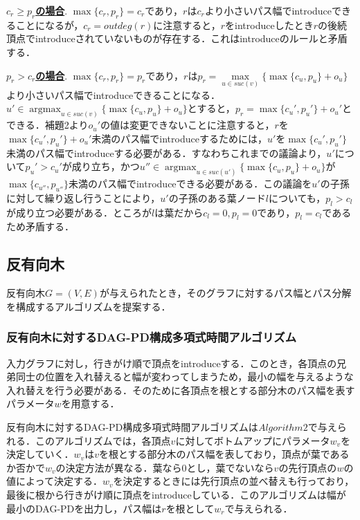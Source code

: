 \documentclass{kuisthesis}           %
\begin{document}
 \textbf{\underline{$c_r \geq p_r$の場合}}.
 $ \max\{c_r, p_r\}=c_r$であり，$r$は$c_r$より小さいパス幅でintroduceできることになるが，$c_r=outdeg(r)$に注意すると，$r$をintroduceしたとき$r$の後続頂点でintroduceされていないものが存在する．これはintroduceのルールと矛盾する．

 \textbf{\underline{$p_r > c_r$の場合}}.
 $ \max\{c_r, p_r\}=p_r$であり，$r$は$p_r= \underset{u \in suc(v)}{\max}\{ \max\{c_u, p_u\}+o_u\}$より小さいパス幅でintroduceできることになる．$u' \in\operatorname*{argmax}_{u \in suc(v)} \{\max\{c_u, p_u\}+o_u\}$とすると，$p_r= \max\{c_u', p_u'\}+o_u'$とできる．補題2より$o_u'$の値は変更できないことに注意すると，$r$を$ \max\{c_u', p_u'\}+o_u'$未満のパス幅でintroduceするためには，$u'$を$ \max\{c_u', p_u'\}$未満のパス幅でintroduceする必要がある．すなわちこれまでの議論より，$u'$について$p_u'>c_u'$が成り立ち，かつ$u'' \in \operatorname*{argmax}_{u \in suc(u')} \{\max\{c_u, p_u\}+o_u\}$が$ \max\{c_{u''}, p_{u''}\}$未満のパス幅でintroduceできる必要がある．この議論を$u'$の子孫に対して繰り返し行うことにより，$u'$の子孫のある葉ノード$l$についても，$p_l>c_l$が成り立つ必要がある．ところが$l$は葉だから$c_l=0, p_l=0$であり，$p_l=c_l$であるため矛盾する．

 


 
 \subsection{反有向木}
反有向木$G=(V, E)$が与えられたとき，そのグラフに対するパス幅とパス分解を構成するアルゴリズムを提案する．

 \subsubsection{反有向木に対するDAG-PD構成多項式時間アルゴリズム}
 
 入力グラフに対し，行きがけ順で頂点をintroduceする．このとき，各頂点の兄弟同士の位置を入れ替えると幅が変わってしまうため，最小の幅を与えるような入れ替えを行う必要がある．そのために各頂点を根とする部分木のパス幅を表すパラメータ$w$を用意する．
 
 反有向木に対するDAG-PD構成多項式時間アルゴリズムは$Algorithm 2$で与えられる．このアルゴリズムでは，各頂点$v$に対してボトムアップにパラメータ$w_v$を決定していく．$w_v$は$v$を根とする部分木のパス幅を表しており，頂点が葉であるか否かで$w_v$の決定方法が異なる．葉なら0とし，葉でないなら$v$の先行頂点の$w$の値によって決定する．$w_v$を決定するときには先行頂点の並べ替えも行っており，最後に根から行きがけ順に頂点をintroduceしている．このアルゴリズムは幅が最小のDAG-PDを出力し，パス幅は$r$を根として$w_r$で与えられる．
\end{document}
